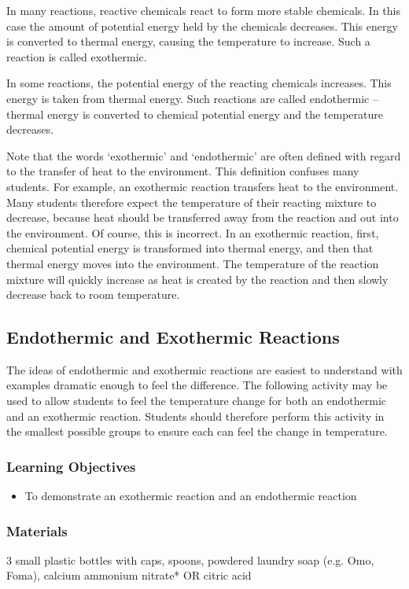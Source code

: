 In many reactions, reactive chemicals react to form more stable chemicals. In this case the amount of potential energy held by the chemicals decreases. This energy is converted to thermal energy, causing the temperature to increase. Such a reaction is called exothermic.

In some reactions, the potential energy of the reacting chemicals increases. This energy is taken from thermal energy. Such reactions are called endothermic -- thermal energy is converted to chemical potential energy and the temperature decreases.

Note that the words `exothermic' and `endothermic' are often defined with regard to the transfer of heat to the environment. This definition confuses many students. For example, an exothermic reaction transfers heat to the environment. Many students therefore expect the temperature of their reacting mixture to decrease, because heat should be transferred away from the reaction and out into the environment. Of course, this is incorrect. In an exothermic reaction, first, chemical potential energy is transformed into thermal energy, and then that thermal energy moves into the environment. The temperature of the reaction mixture will quickly increase as heat is created by the reaction and then slowly decrease back to room temperature.

\subsection{Endothermic and Exothermic Reactions}

The ideas of endothermic and exothermic reactions are easiest to understand with examples dramatic enough to feel the difference. The following activity may be used to allow students to feel the temperature change for both an endothermic and an exothermic reaction. Students should therefore perform this activity in the smallest possible groups to ensure each can feel the change in temperature.

\subsubsection*{Learning Objectives}
\begin{itemize}
\item{To demonstrate an exothermic reaction and an endothermic reaction}
\end{itemize}

\subsubsection*{Materials}
3 small plastic bottles with caps, spoons, powdered laundry soap (e.g. Omo, Foma), calcium ammonium nitrate* OR citric acid 

